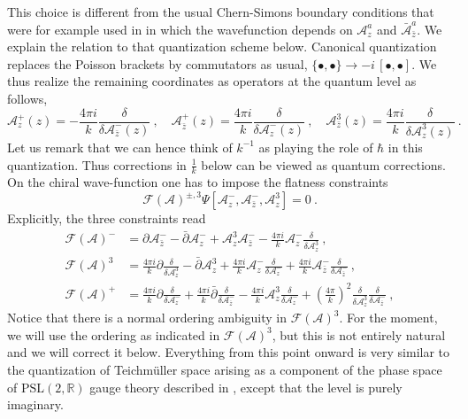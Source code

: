 \documentclass[12pt,a4paper]{article}
\newcommand{\be}{\begin{equation}}
\newcommand{\ee}{\end{equation}}
\newcommand\PSL{\text{PSL}}
\newcommand\RR{\mathbb{R}}
\begin{document}
This choice is different from the usual Chern-Simons boundary conditions that were for example used in \cite{Witten:1989ip} in which the wavefunction depends on $\mathcal{A}_z^a$ and $\bar{\mathcal{A}}_{\bar{z}}^a$. We explain the relation to that quantization scheme below. Canonical quantization replaces the Poisson brackets by commutators as usual, $\{ \bullet, \bullet \} \longrightarrow -i\,  [ \bullet, \bullet]$. We thus realize the remaining coordinates as operators at the quantum level as follows,  
\be 
\mathcal{A}^+_z(z)=-\frac{4\pi i}{k}\frac{\delta}{\delta \mathcal{A}^-_{\bar{z}}(z)}~,\quad 
\mathcal{A}^+_{\bar{z}}(z)=\frac{4\pi i}{k}\frac{\delta}{\delta \mathcal{A}^-_{z}(z)}~,\quad
\mathcal{A}^3_{\bar{z}}(z)=\frac{4\pi i}{k}\frac{\delta}{\delta \mathcal{A}^3_{z}(z)} ~. \label{eq:A functional derivative}
\ee
Let us remark that we can hence think of $k^{-1}$ as playing the role of $\hbar$ in this quantization. Thus corrections in $\frac{1}{k}$ below can be viewed as quantum corrections.
On the chiral wave-function one has to impose the flatness constraints
\be 
\mathcal{F}(\mathcal{A})^{\pm,3}\Psi[\mathcal{A}_z^-,\mathcal{A}_{\bar{z}}^-,\mathcal{A}_z^3]=0~. \label{eq:chiral constraints}
\ee
Explicitly, the three constraints read
\begin{subequations}
\begin{align}
    \mathcal{F}(\mathcal{A})^-&=\partial \mathcal{A}_{\bar{z}}^--\bar{\partial} \mathcal{A}_z^-+\mathcal{A}_z^3 \mathcal{A}_{\bar{z}}^--\frac{4\pi i}{k} \mathcal{A}_z^- \frac{\delta}{\delta \mathcal{A}_z^3}~ , \label{eq:F- constraint}\\
    \mathcal{F}(\mathcal{A})^3&=\frac{4\pi i}{k} \partial \frac{\delta}{\delta \mathcal{A}_z^3}-\bar{\partial} \mathcal{A}_z^3+\frac{4\pi i}{k} \mathcal{A}_z^- \frac{\delta}{\delta \mathcal{A}_z^-}+\frac{4\pi i}{k} \mathcal{A}_{\bar{z}}^- \frac{\delta}{\delta \mathcal{A}_{\bar{z}}^-}~, \label{eq:F3 constraint}\\
    \mathcal{F}(\mathcal{A})^+&=\frac{4\pi i}{k}\partial \frac{\delta}{\delta \mathcal{A}_z^-}+\frac{4\pi i}{k} \bar{\partial} \frac{\delta}{\delta \mathcal{A}_{\bar{z}}^-}-\frac{4\pi i}{k} \mathcal{A}_z^3\frac{\delta}{\delta \mathcal{A}_z^-}+\left(\frac{4\pi}{k}\right)^2 \frac{\delta}{\delta \mathcal{A}_z^3} \frac{\delta}{\delta \mathcal{A}_{\bar{z}}^-}~, \label{eq:F+ constraint}
\end{align}
\end{subequations}
Notice that there is a normal ordering ambiguity in $\mathcal{F}(\mathcal{A})^3$. For the moment, we will use the ordering as indicated in $\mathcal{F}(\mathcal{A})^3$, but this is not entirely natural and we will correct it below.
Everything from this point onward is very similar to the quantization of Teichm\"uller space arising as a component of the phase space of $\PSL(2,\RR)$ gauge theory described in \cite{Verlinde:1989ua}, except that the level is purely imaginary. 
\end{document}
